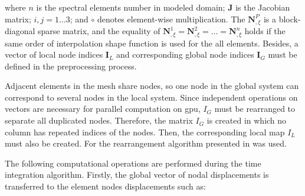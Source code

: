 \documentclass[11pt,a4paper,final]{report}
\begin{document}
where $n$ is the spectral elements number in modeled domain; \textbf{J} is the Jacobian matrix; $i,j=1\ldots3$; and $\circ$ denotes element-wise multiplication.
The $\textbf{N}^P_{,\xi}$ is a block-diagonal sparse matrix, and the equality of $\textbf{N}^1_{,\xi}=\textbf{N}^2_{,\xi}=\ldots=\textbf{N}^n_{,\xi}$ holds if the same order of interpolation shape function is used for the all elements.
Besides, a vector of local node indices $\textbf{I}_L$ and corresponding global node indices $\textbf{I}_G$ must be defined in the preprocessing process.

Adjacent elements in the mesh share nodes, so one node in the global system can correspond to several nodes in the local system. Since independent operations on vectors are necessary for parallel computation on \ac{gpu}, $I_{G}$ must be rearranged to separate all duplicated nodes. Therefore, the matrix $I_{G}$ is created in which no column has repeated indices of the nodes. Then, the corresponding local map $I_{L}$ must also be created. For the rearrangement algorithm presented in \cite{kudela2016parallel} was used.

The following computational operations are performed during the time integration algorithm. Firstly, the global vector of nodal displacements is transferred to the element nodes displacements such as:
\end{document}
